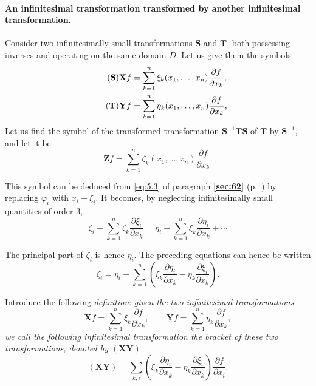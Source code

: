 \documentclass[leqno,11pt]{book}
\makeatletter
\numberwithin{equation}{chapter}
\newcommand{\pd}{\partial}
\theoremstyle{shape1}
\theoremstyle{shapesmall}
\let\old@phi\phi
\let\old@varphi\varphi
\let\phi\old@varphi
\let\varphi\old@phi
\newcommand{\fsref}[1]{{\rm\textsection\textbf{\ref{sec:#1}}}}
\newcommand{\somespace}{\vspace{9pt}}
\makeatother
\begin{document}
\paragraph{An infinitesimal transformation transformed by another infinitesimal transformation.}
\label{sec:205}
Consider two infinitesimally small transformations $\mathbf{S}$ and $\mathbf{T}$, both possessing inverses and operating on the same domain $D$. Let us give them the symbols
\begin{align}
  \label{eq:14.S}\tag{$\mathbf{S}$}
  \mathbf{X}f&=\sum_{k=1}^{n}\xi_{k}(x_{1},\dots,x_{n})\frac{\pd f}{\pd x_{k}},\\
  \label{eq:14.T}\tag{$\mathbf{T}$}
  \mathbf{Y}f&=\sum_{k=1}^{n}\eta_{k}(x_{1},\dots,x_{n})\frac{\pd f}{\pd x_{k}},
\end{align}
Let us find the symbol of the transformed transformation $\mathbf{S}^{-1}\mathbf{TS}$ of $\mathbf{T}$ by $\mathbf{S}^{-1}$, and let it be
\[
  \mathbf{Z}f=\sum_{k=1}^{n}\zeta_{k}(x_{1},\dots,x_{n})\frac{\pd f}{\pd x_{k}}.
\]

This symbol can be deduced from \eqref{eq:5.3} of paragraph \fsref{62} (p.~\pageref{sec:62}) by replacing $\phi_{i}$ with $x_{i}+\xi_{i}$. It becomes, by neglecting infinitesimally small quantities of order $3$,
\[
\zeta_{i}+\sum_{k=1}^{n}\zeta_{k}\frac{\pd \xi_{i}}{\pd x_{k}}=\eta_{i}+\sum_{k=1}^{n}\xi_{k}\frac{\pd \eta_{i}}{\pd x_{k}}+\cdots
\]

The principal part of $\zeta_{i}$ is hence $\eta_{i}$. The preceding equations can hence be written
\begin{equation}
  \label{eq:14.1}
  \zeta_{i}=\eta_{i}+\sum_{k=1}^{n}\left(\xi_{k}\frac{\pd \eta_{i}}{\pd x_{k}}-\eta_{k}\frac{\pd \xi_{i}}{\pd x_{k}}\right).
\end{equation}

\somespace 

Introduce the following \emph{definition}: \emph{given the two infinitesimal transformations}
\[
\mathbf{X}f=\sum_{k=1}^{n}\xi_{k}\frac{\pd f}{\pd x_{k}},\qquad\mathbf{Y}f=\sum_{k=1}^{n}\eta_{k}\frac{\pd f}{\pd x_{k}},
\]
\emph{we call the following infinitesimal transformation the bracket of these two transformations, denoted by $(\mathbf{XY})$}
\begin{equation}
  \label{eq:14.2}
  (\mathbf{XY})=\sum_{k,i}\left(\xi_{k}\frac{\pd \eta_{i}}{\pd x_{k}}-\eta_{k}\frac{\pd \xi_{i}}{\pd x_{k}}\right)\frac{\pd f}{\pd x_{i}}.
\end{equation}
\end{document}
